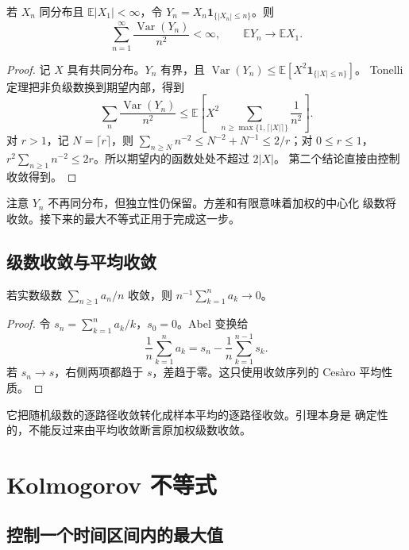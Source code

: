 \begin{lemma}[线性截断的方差和]
\label{lem:linear-truncation-variance}
若 $X_n$ 同分布且 $\mathbb E|X_1|<\infty$，令
$Y_n=X_n\mathbf1_{\{|X_n|\le n\}}$。则
\[
 \sum_{n=1}^\infty\frac{\operatorname{Var}(Y_n)}{n^2}<\infty,
 \qquad \mathbb E Y_n\longrightarrow\mathbb E X_1.
\]
\end{lemma}

\begin{proof}
记 $X$ 具有共同分布。$Y_n$ 有界，且
$\operatorname{Var}(Y_n)\le\mathbb E[X^2\mathbf1_{\{|X|\le n\}}]$。
Tonelli 定理把非负级数换到期望内部，得到
\[
 \sum_n\frac{\operatorname{Var}(Y_n)}{n^2}
 \le\mathbb E\left[X^2\sum_{n\ge\max\{1,\lceil|X|\rceil\}}\frac1{n^2}\right].
\]
对 $r>1$，记 $N=\lceil r\rceil$，则
$\sum_{n\ge N}n^{-2}\le N^{-2}+N^{-1}\le2/r$；对 $0\le r\le1$，
$r^2\sum_{n\ge1}n^{-2}\le2r$。所以期望内的函数处处不超过 $2|X|$。
第二个结论直接由控制收敛得到。
\end{proof}

注意 $Y_n$ 不再同分布，但独立性仍保留。方差和有限意味着加权的中心化
级数将收敛。接下来的最大不等式正用于完成这一步。

\subsection{级数收敛与平均收敛}

\begin{lemma}[Kronecker 引理]
\label{lem:kronecker-average}
若实数级数 $\sum_{n\ge1}a_n/n$ 收敛，则
$n^{-1}\sum_{k=1}^na_k\to0$。
\end{lemma}

\begin{proof}
令 $s_n=\sum_{k=1}^na_k/k$，$s_0=0$。Abel 变换给
\[
 \frac1n\sum_{k=1}^na_k
 =s_n-\frac1n\sum_{k=1}^{n-1}s_k.
\]
若 $s_n\to s$，右侧两项都趋于 $s$，差趋于零。这只使用收敛序列的
Cesàro 平均性质。
\end{proof}

它把随机级数的逐路径收敛转化成样本平均的逐路径收敛。引理本身是
确定性的，不能反过来由平均收敛断言原加权级数收敛。

\section{Kolmogorov 不等式}
\label{sec:kolmogorov-maximal-inequality}

\subsection{控制一个时间区间内的最大值}

